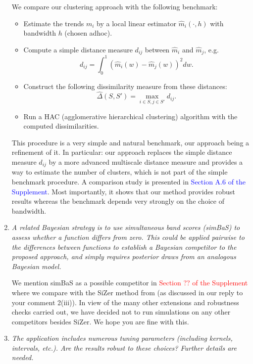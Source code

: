 \documentclass[a4paper,12pt]{article}
\begin{document}
\begin{enumerate}[label=\arabic*.,leftmargin=0.6cm]
We compare our clustering approach with the following benchmark: 
\begin{itemize}[leftmargin=0.45cm,itemsep=0pt,topsep=0pt]
\item Estimate the trends $m_i$ by a local linear estimator $\hat{m}_i(\cdot,h)$ with bandwidth $h$ (chosen adhoc).
\item Compute a simple distance measure $d_{ij}$ between $\hat{m}_i$ and $\hat{m}_j$, e.g.
\[ d_{ij} = \int_0^1 (\hat{m}_i(w) - \hat{m}_j(w))^2 dw. \]
\item Construct the following dissimilarity measure from these distances:
\[ \hat{\Delta}(S,S') = \max_{i \in S,j \in S'} d_{ij}. \]
\item Run a HAC (agglomerative hierarchical clustering) algorithm with the computed dissimilarities. 
\end{itemize}
This procedure is a very simple and natural benchmark, our approach being a refinement of it. In particular: our approach replaces the simple distance measure $d_{ij}$ by a more advanced multiscale distance measure and provides a way to estimate the number of clusters, which is not part of the simple benchmark procedure. A comparison study is presented in \textcolor{blue}{Section A.6 of the Supplement}. Most importantly, it shows that our method provides robust results whereas the benchmark depends very strongly on the choice of bandwidth.  

    
\item \textit{A related Bayesian strategy is to use simultaneous band scores (simBaS) to assess whether a function differs from zero. This could be applied pairwise to the differences between functions to establish a Bayesian competitor to the proposed approach, and simply requires posterior draws from an analogous Bayesian model.}

We mention simBaS as a possible competitor in \textcolor{red}{Section ?? of the Supplement} where we compare with the SiZer method from \cite{Park2009} (as discussed in our reply to your comment 2(iii)). In view of the many other extensions and robustness checks carried out, we have decided not to run simulations on any other competitors besides SiZer. We hope you are fine with this. 

  
\item \textit{The application includes numerous tuning parameters (including kernels, intervals, etc.). Are the results robust to these choices? Further details are needed.}
  

\end{enumerate}
\end{document}
